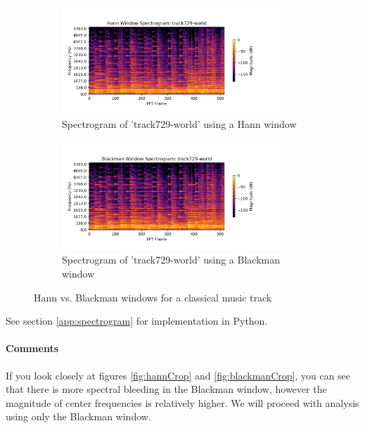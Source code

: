\documentclass[11pt,a4paper]{article}
\begin{document}
\begin{figure}[tb]
	\centering
	\begin{subfigure}[t]{\hsize}
		\centering
		\includegraphics[width=0.9\textwidth]{powerHann_track729-world}
		\caption{Spectrogram of 'track729-world' using a Hann window}
		\label{fig:hann_world}
	\end{subfigure}
	\begin{subfigure}[t]{\hsize}
		\centering
		\includegraphics[width=0.9\textwidth]{powerBlack_track729-world}
		\caption{Spectrogram of 'track729-world' using a Blackman window}
		\label{fig:black_world}
	\end{subfigure}
	\caption{Hann vs. Blackman windows for a classical music track}
	\label{fig:windows_world}
\end{figure}

See section \ref{app:spectrogram} for implementation in Python.

\paragraph{Comments} If you look closely at figures \ref{fig:hannCrop} and \ref{fig:blackmanCrop}, you can see that there is more spectral bleeding in the Blackman window, however the magnitude of center frequencies is relatively higher. We will proceed with analysis using only the Blackman window.
\end{document}
